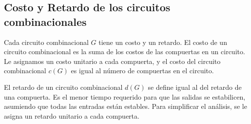 \subsection{Costo y Retardo de los circuitos combinacionales}
Cada circuito combinacional \(G\) tiene un costo y un retardo. El costo de un circuito combinacional es la suma de los costos de las compuertas en un circuito. Le asignamos un costo unitario a cada compuerta, y el costo del circuito combinacional \(c(G)\) es igual al número de compuertas en el circuito.

El retardo de un circuito combinacional \(d(G)\) se define igual al del retardo de una compuerta. Es el menor tiempo requerido para que las salidas se estabilicen, asumiendo que todas las entradas están estables. Para simplificar el análisis, se le asigna un retardo unitario a cada compuerta.



